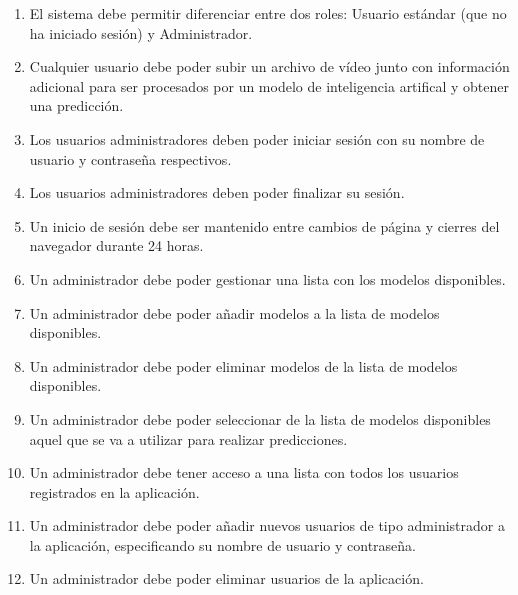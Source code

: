 \begin{enumerate}[start=1,label={\bfseries RF\arabic*:}]
    \item El sistema debe permitir diferenciar entre dos roles: Usuario estándar
          (que no ha iniciado sesión) y Administrador.

          
    \item Cualquier usuario debe poder subir un archivo de vídeo junto con
          información adicional para ser procesados por un modelo de
          inteligencia artifical y obtener una predicción.


    \item Los usuarios administradores deben poder iniciar sesión con su nombre
          de usuario y contraseña respectivos.
    \item Los usuarios administradores deben poder finalizar su sesión.
    \item Un inicio de sesión debe ser mantenido entre cambios de página y
          cierres del navegador durante 24 horas.
    \item Un administrador debe poder gestionar una lista con los modelos
          disponibles.


    \item Un administrador debe poder añadir modelos a la lista de modelos
          disponibles.
    \item Un administrador debe poder eliminar modelos de la lista de modelos
          disponibles.
    \item Un administrador debe poder seleccionar de la lista de modelos
          disponibles aquel que se va a utilizar para realizar predicciones.
    \item Un administrador debe tener acceso a una lista con todos los usuarios
          registrados en la aplicación.


    \item Un administrador debe poder añadir nuevos usuarios de tipo
          administrador a la aplicación, especificando su nombre de usuario y
          contraseña.
    \item Un administrador debe poder eliminar usuarios de la aplicación.
\end{enumerate}

